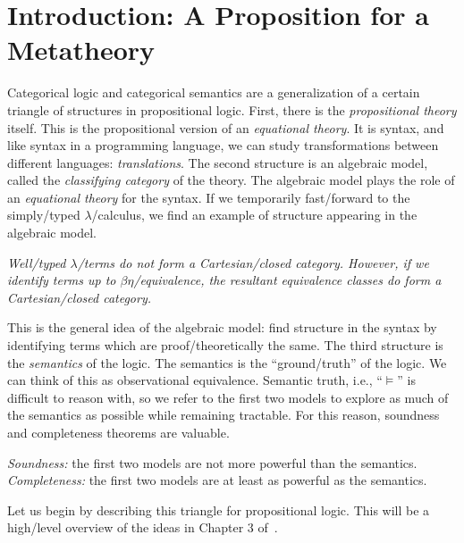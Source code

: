 \documentclass[../main.tex]{subfiles}
\begin{document}

\makehmtitle%

\section{Introduction: A Proposition for a Metatheory}

Categorical logic and categorical semantics are a generalization of a certain
triangle of structures in propositional logic. First, there is the
\emph{propositional theory} itself. This is the propositional version of an
\emph{equational theory}. It is syntax, and like syntax in a programming
language, we can study transformations between different languages:
\emph{translations}. The second structure is an algebraic model, called the
\emph{classifying category} of the theory. The algebraic model plays the role of
an \emph{equational theory} for the syntax. If we temporarily fast\-/forward to
the simply\-/typed \(\lambda\)\-/calculus, we find an example of structure
appearing in the algebraic model.
\begin{indented}
  \emph{%
    Well\-/typed \(\lambda\)\-/terms do not form a Cartesian\-/closed
    category. However, if we identify terms up to \(\beta\eta\)\-/equivalence,
    the resultant equivalence classes do form a Cartesian\-/closed category.
  }%
\end{indented}
\noindent This is the general idea of the algebraic model: find structure in the
syntax by identifying terms which are proof\-/theoretically the same. The third
structure is the \emph{semantics} of the logic. The semantics is the
``ground\-/truth'' of the logic. We can think of this as observational
equivalence. Semantic truth, i.e., ``\(\vDash\)'' is difficult to reason with,
so we refer to the first two models to explore as much of the semantics as
possible while remaining tractable. For this reason, soundness and completeness
theorems are valuable.
\begin{indented}
  \emph{Soundness:} the first two models are not more powerful than the
  semantics.\\
  \emph{Completeness:} the first two models are at least as powerful as the
  semantics.
\end{indented}
Let us begin by describing this triangle for propositional logic. This will be a
high\-/level overview of the ideas in Chapter 3 of~\cite{Halvorson2019}.
\end{document}
